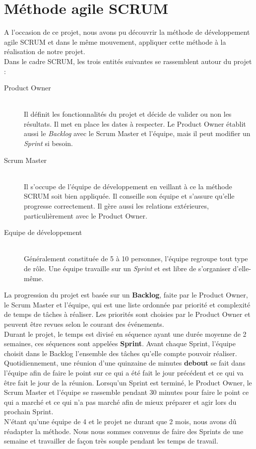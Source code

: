 \section{Méthode agile SCRUM}

A l'occasion de ce projet, nous avons pu découvrir la méthode de développement
 agile SCRUM  et dans le même mouvement, appliquer cette méthode à la réalisation de notre projet.\\
 
Dans le cadre SCRUM, les trois entités suivantes se rassemblent autour du projet :

\begin{description}
	\item[Product Owner] \hfill \\
		Il définit les fonctionnalités du projet et décide de valider ou non les résultats. Il met en place les dates à respecter. Le Product Owner établit aussi le \textit{Backlog} avec le Scrum Master et l'équipe, mais il peut modifier un \textit{Sprint} si besoin.
	\item[Scrum Master] \hfill \\
		Il s'occupe de l'équipe de développement en veillant à ce la méthode SCRUM soit bien appliquée. Il conseille son équipe et s'assure qu'elle progresse correctement. Il gère aussi les relations extérieures, particulièrement avec le Product Owner.
	\item[Equipe de développement] \hfill \\
		Généralement constituée de 5 à 10 personnes, l'équipe regroupe tout type de rôle. Une équipe travaille sur un \textit{Sprint} et est libre de s'organiser d'elle-même.
\end{description}

La progression du projet est basée sur un \textbf{Backlog}, faite par le Product Owner, le Scrum Master et l'équipe, qui est une liste ordonnée par priorité et complexité de temps de tâches à réaliser. Les priorités sont choisies par le Product Owner et peuvent être revues selon le courant des événements. \\

Durant le projet, le temps est divisé en séquence ayant une durée moyenne de 2 semaines, ces séquences sont appelées \textbf{Sprint}. Avant chaque Sprint, l'équipe choisit dans le Backlog l'ensemble des tâches qu'elle compte pouvoir réaliser. \\

Quotidiennement, une réunion d'une quinzaine de minutes \textbf{debout} se fait dans l'équipe afin de faire le point sur ce qui a été fait le jour précédent et ce qui va être fait le jour de la réunion. Lorsqu'un Sprint est terminé, le Product Owner, le Scrum Master et l'équipe se rassemble pendant 30 minutes pour faire le point ce qui a marché et ce qui n'a pas marché afin de mieux préparer et agir lors du prochain Sprint. \\

N'étant qu'une équipe de 4 et le projet ne durant que 2 mois, nous avons dû réadapter la méthode. Nous nous sommes convenus de faire des Sprints de une semaine et travailler de façon très souple pendant les temps de travail.